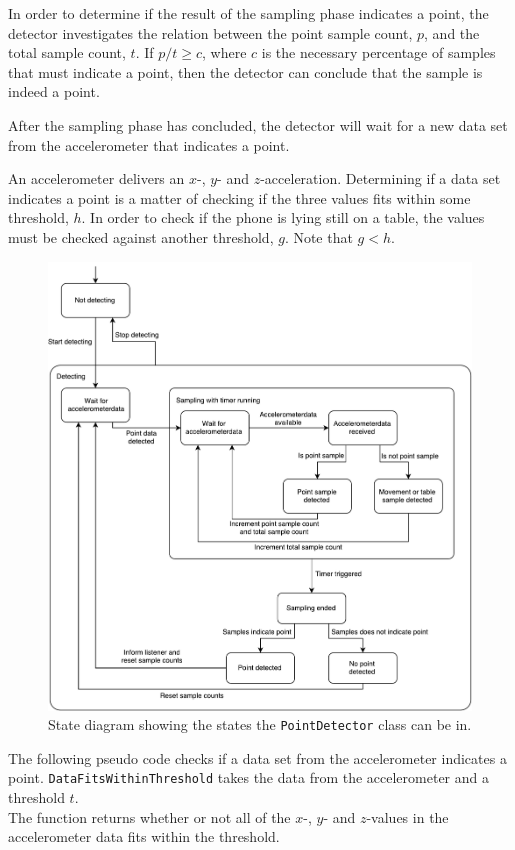 In order to determine if the result of the sampling phase indicates a point, 
the detector investigates the relation between the point sample count, $p$, 
and the total sample count, $t$. 
If $p/t \geq c$, where $c$ is the necessary percentage of samples that must indicate a point, 
then the detector can conclude that the sample is indeed a point.

After the sampling phase has concluded, 
the detector will wait for a new data set from the accelerometer that indicates a point.

An accelerometer delivers an $x$-, $y$- and $z$-acceleration. 
Determining if a data set indicates a point is a matter of checking if the three values fits within some threshold, $h$. 
In order to check if the phone is lying still on a table, 
the values must be checked against another threshold, $g$. Note that $g < h$.

\begin{figure}
\centering
\includegraphics[width=\textwidth]{images/point-detector-state-diagram}
\caption{State diagram showing the states the \texttt{PointDetector} class can be in.}
\label{fig:gesture-recognition:pointdetector-state-diagram}
\end{figure}

The following pseudo code checks if a data set from the accelerometer indicates a point. 
\texttt{DataFitsWithinThreshold} takes the data from the accelerometer and a threshold $t$. \\
The function returns whether or not all of the $x$-, $y$- and $z$-values in the accelerometer data fits within the threshold.

